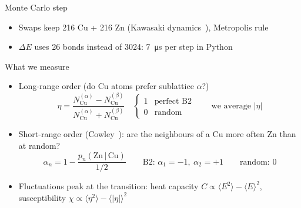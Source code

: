 \documentclass[aspectratio=169, 11pt]{beamer}
\newcommand{\Cu}{\mathrm{Cu}}
\newcommand{\Zn}{\mathrm{Zn}}
\begin{document}
\begin{frame}{Monte Carlo step}
  \centering

  \vspace{0.6cm}
  \begin{itemize}
    \item \alert{Swaps} keep 216 Cu + 216 Zn (Kawasaki dynamics~\cite{Kawasaki1966}), Metropolis rule~\cite{Metropolis1953}
    \item $\Delta E$ uses 26 bonds instead of 3024: \SI{7}{\micro s} per step in Python
  \end{itemize}
\end{frame}

\begin{frame}{What we measure}
  \begin{itemize}
    \item \alert{Long-range order} (do Cu atoms prefer sublattice $\alpha$?)
      \[ \eta = \frac{N_\Cu^{(\alpha)}-N_\Cu^{(\beta)}}{N_\Cu^{(\alpha)}+N_\Cu^{(\beta)}}
         \quad\begin{cases} 1 & \text{perfect B2}\\ 0 & \text{random}\end{cases}
         \qquad\text{we average } |\eta| \]
    \item \alert{Short-range order} (Cowley~\cite{Cowley1950}): are the neighbours of a Cu more often Zn than at random?
      \[ \alpha_n = 1 - \frac{p_n(\Zn\,|\,\Cu)}{1/2}\qquad \text{B2: } \alpha_1=-1,\ \alpha_2=+1 \qquad \text{random: } 0\]
    \item \alert{Fluctuations} peak at the transition:
      heat capacity $C \propto \langle E^2\rangle - \langle E\rangle^2$,\;
      susceptibility $\chi \propto \langle \eta^2\rangle - \langle |\eta|\rangle^2$
  \end{itemize}
\end{frame}
\end{document}
